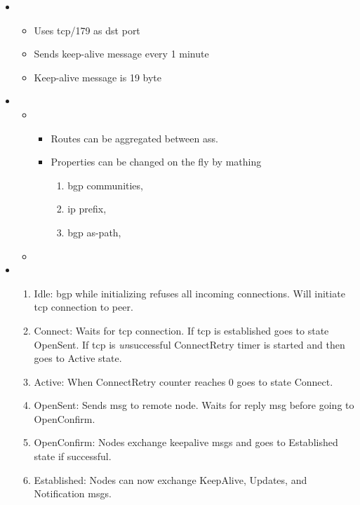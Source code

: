 \begin{itemize}
    \item {}
    \begin{itemize}
        \item Uses tcp/179 as \gls{dst} port
        \item Sends keep-alive message every 1 minute
        \item Keep-alive message is 19 byte
    \end{itemize}
    \item {}
    \begin{itemize}
        \item {}
        \begin{itemize}
            \item Routes can be aggregated between \Glspl{as}.
            \item Properties can be changed on the fly by mathing
            \begin{enumerate}[label={\alph*)}]
                \item \Gls{bgp} communities,
                \item \Gls{ip} prefix,
                \item \Gls{bgp} as-path, 
            \end{enumerate}
        \end{itemize}
        \item 
    \end{itemize}
    \item {}
    \begin{enumerate}
        \item Idle: \Gls{bgp} while initializing refuses all incoming connections. Will initiate \Gls{tcp} connection to peer.
        \item Connect: Waits for \Gls{tcp} connection. If \Gls{tcp} is established goes to state OpenSent. If \Gls{tcp} is \textit{un}successful ConnectRetry timer is started and then goes to Active state.
        \item Active: When ConnectRetry counter reaches 0 goes to state Connect.
        \item OpenSent: Sends \gls{msg} to remote node. Waits for reply \gls{msg} before going to OpenConfirm.
        \item OpenConfirm: Nodes exchange keepalive \glspl{msg} and goes to Established state if successful.
        \item Established: Nodes can now exchange KeepAlive, Updates, and Notification \glspl{msg}.
    \end{enumerate}
\end{itemize}


